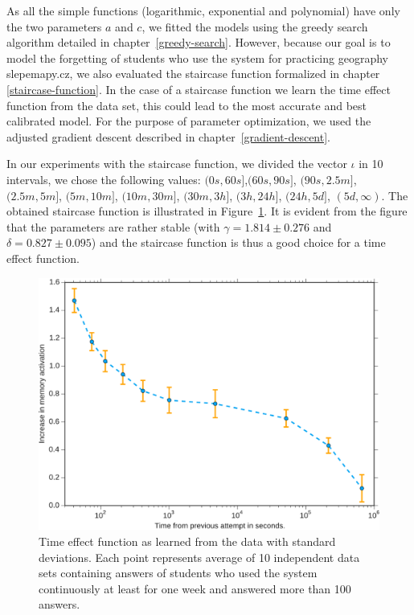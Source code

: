 As all the simple functions (logarithmic, exponential and polynomial) have only the two parameters $a$ and $c$, we fitted the models using the greedy search algorithm detailed in chapter~\ref{greedy-search}. However, because our goal is to model the forgetting of students who use the system for practicing geography slepemapy.cz, we also evaluated the staircase function formalized in chapter \ref{staircase-function}. In the case of a staircase function we learn the time effect function from the data set, this could lead to the most accurate and best calibrated model. For the purpose of parameter optimization, we used the adjusted gradient descent described in chapter~\ref{gradient-descent}.

In our experiments with the staircase function, we divided the vector $\iota$ in 10 intervals, we chose the following values: $(0s, 60s]$,$(60s, 90s]$, $(90s, 2.5m]$, $(2.5m, 5m]$, $(5m, 10m]$, $(10m, 30m]$, $(30m, 3h]$, $(3h, 24h]$, $(24h, 5d]$, $(5d, \infty)$. The obtained staircase function is illustrated in Figure~\ref{fig:learned-time-effect-function}. It is evident from the figure that the parameters are rather stable (with $\gamma = 1.814 \pm 0.276$ and $\delta = 0.827 \pm 0.095$) and the staircase function is thus a good choice for a time effect function.

\begin{figure}[htbp]
  \centering
  \includegraphics[width=\textwidth]{img/learned-time-effect-function}
  \caption{Time effect function as learned from the data with standard deviations. Each point represents average of 10 independent data sets containing answers of students who used the system continuously at least for one week and answered more than 100 answers.}
  \label{fig:learned-time-effect-function}
\end{figure}

